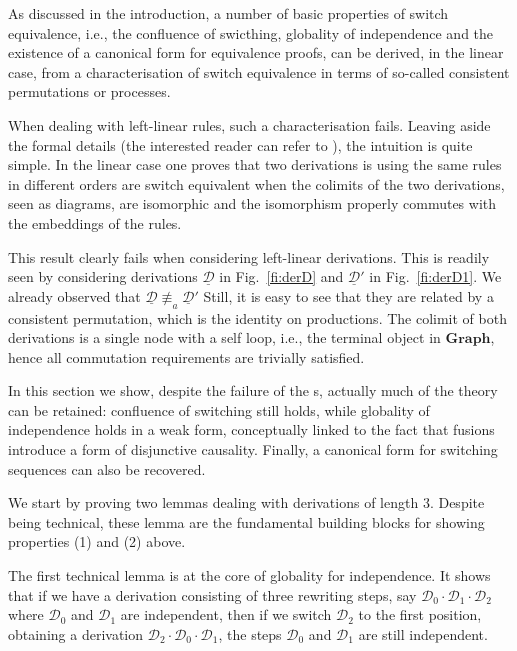 \documentclass[a4paper,UKenglish,cleveref,pdftex,thm-restate,numberwithinsect,anonymous]{lipics}
\newcommand{\cat}[1]{\ensuremath{\mathbf{#1}}}
\newcommand{\dder}[1]{\mathscr{#1}}
\newcommand{\der}[1]{\underline{\dder{#1}}}
\begin{document}
As discussed in the introduction, a number of basic properties of
switch equivalence, i.e., the confluence of swicthing, globality of
independence and the existence of a canonical form for equivalence
proofs, can be derived, in the linear case, from a characterisation of
switch equivalence in terms of so-called consistent permutations or
processes.

When dealing with left-linear rules, such a characterisation fails. Leaving aside the formal details (the interested reader can refer to ), the intuition is quite simple. In the linear case one proves that two derivations is using the same rules in different orders are switch equivalent when the colimits of the two derivations, seen as diagrams, are isomorphic and the isomorphism properly commutes with the embeddings of the rules.

This result clearly fails when considering left-linear
derivations. This is readily seen by considering derivations $\der{D}$
in Fig.~\ref{fi:derD} and $\der{D}'$ in Fig.~\ref{fi:derD1}. We
already observed that $\der{D} \not\equiv_a \der{D}'$
% 
Still, it is easy to see that they are related by a consistent
permutation, which is the identity on productions. The colimit of
both derivations is a single node with a self loop, i.e., the
terminal object in $\cat{Graph}$, hence all commutation requirements
are trivially satisfied.

In this section we show, despite the failure of the s, actually much of the theory can
be retained: confluence of switching still holds, while globality of
independence holds in a weak form, conceptually linked to the fact
that fusions introduce a form of disjunctive causality. Finally, a
canonical form for switching sequences can also be recovered.

We start by proving two lemmas dealing with derivations of length
$3$. Despite being technical, these lemma are the fundamental building blocks for showing properties (1) and (2) above.

The first technical lemma is at the core of globality for independence. It shows that if we have a derivation consisting of three rewriting steps, say $\dder{D}_0\cdot \dder{D}_1 \cdot \dder{D}_2$ where $\dder{D}_0$ and $\dder{D}_1$ are independent, then if we switch $\dder{D}_2$ to the first position, 
obtaining a derivation $\dder{D}_2 \cdot  \dder{D}_0\cdot\dder{D}_1$, the steps $\dder{D}_0$ and $\dder{D}_1$ are still independent.
\end{document}
